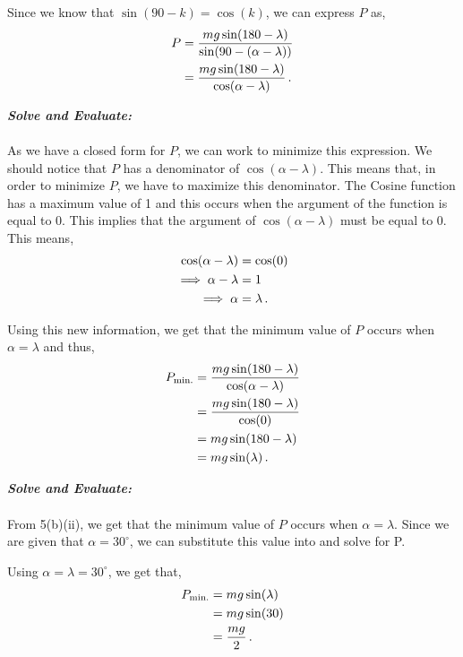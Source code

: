 \begin{subquestions}
\begin{subsubquestions}
Since we know that $\sin(90-k)=\cos(k)$, we can express $P$ as,
\begin{align}
	P & = \frac{mg\sin(180-\lambda)}{\sin(90-(\alpha-\lambda))} \nonumber \\
	  & = \frac{mg\sin(180-\lambda)}{\cos(\alpha-\lambda)} \,.
\end{align}

\textbf{\textit{Solve and Evaluate:}} \\ \\
As we have a closed form for $P$, we can work to minimize this expression. We should notice that $P$ has a denominator of $\cos(\alpha - \lambda)$. This means that, in order to minimize $P$, we have to maximize this denominator. The Cosine function has a maximum value of 1 and this occurs when the argument of the function is equal to 0. This implies that the argument of $\cos(\alpha - \lambda)$ must be equal to 0. This means,
\begin{align}
	\cos(\alpha - \lambda) & = \cos(0) \nonumber \\
	\implies \alpha - \lambda & = 1 \nonumber \\
	\implies \alpha & = \lambda \,.
\end{align}

Using this new information, we get that the minimum value of $P$ occurs when $\alpha=\lambda$ and thus,
\begin{align}
	P_{\text{min.}} & = \frac{mg\sin(180-\lambda)}{\cos(\alpha-\lambda)} \nonumber \\
	                & = \frac{mg\sin(180-\lambda)}{\cos(0)} \nonumber \\
	                & = mg\sin(180-\lambda) \nonumber \\
	                & = mg\sin(\lambda) \,. \label{2014:q5:MinP}
\end{align}


\subsubquestion

\textbf{\textit{Solve and Evaluate:}} \\ \\
From 5(b)(ii), we get that the minimum value of $P$ occurs when $\alpha=\lambda$. Since we are given that $\alpha=30^\circ$, we can substitute this value into  and solve for P.

Using $\alpha=\lambda=30^\circ$, we get that,
\begin{align}
	P_{\text{min.}} & = mg\sin(\lambda) \nonumber \\
				    & = mg\sin(30) \nonumber \\
				    & = \frac{mg}{2} \,.
\end{align}
 
\end{subsubquestions}
	
\end{subquestions}